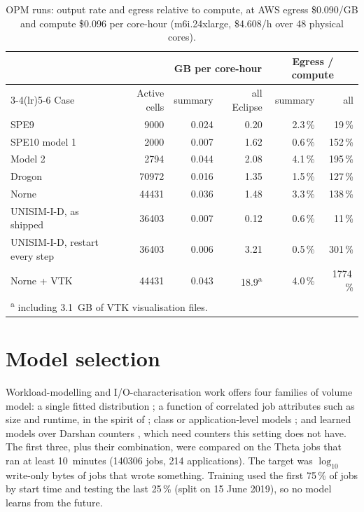 \documentclass[11pt,a4paper]{article}
\begin{document}
\begin{table}[ht]
\centering\small
\caption{OPM runs: output rate and egress relative to compute, at AWS egress
\$0.090/GB and compute \$0.096 per core-hour (m6i.24xlarge, \$4.608/h over 48
physical cores).}\label{tab:opm}
\begin{tabular}{lrrrrr}
\toprule
& & \multicolumn{2}{c}{GB per core-hour} & \multicolumn{2}{c}{Egress / compute} \\
\cmidrule(lr){3-4}\cmidrule(lr){5-6}
Case & Active cells & summary & all Eclipse & summary & all \\
\midrule
SPE9                        & \num{9000}  & 0.024 & 0.20 & 2.3\,\% & 19\,\% \\
SPE10 model 1               & \num{2000}  & 0.007 & 1.62 & 0.6\,\% & 152\,\% \\
Model 2                     & \num{2794}  & 0.044 & 2.08 & 4.1\,\% & 195\,\% \\
Drogon                      & \num{70972} & 0.016 & 1.35 & 1.5\,\% & 127\,\% \\
Norne                       & \num{44431} & 0.036 & 1.48 & 3.3\,\% & 138\,\% \\
UNISIM-I-D, as shipped      & \num{36403} & 0.007 & 0.12 & 0.6\,\% & 11\,\% \\
UNISIM-I-D, restart every step & \num{36403} & 0.006 & 3.21 & 0.5\,\% & 301\,\% \\
Norne + VTK                 & \num{44431} & 0.043 & 18.9\textsuperscript{a} & 4.0\,\% & 1774\,\% \\
\bottomrule
\multicolumn{6}{l}{\footnotesize \textsuperscript{a} including \SI{3.1}{GB} of VTK visualisation files.}
\end{tabular}
\end{table}

\section{Model selection}\label{sec:selection}
Workload-modelling and I/O-characterisation work offers four families of volume
model: a single fitted distribution \citep{feitelson2015workload}; a function of
correlated job attributes such as size and runtime, in the spirit of
\citet{lublin2003workload}; class or application-level models
\citep{feitelson2015workload,luu2015multiplatform}; and learned models over Darshan
counters \citep{isakov2020hpc}, which need counters this setting does not have. The
first three, plus their combination, were compared on the Theta jobs that ran at
least 10~minutes (\num{140306} jobs, 214 applications). The target was
$\log_{10}$ write-only bytes of jobs that wrote something. Training used the first
75\,\% of jobs by start time and testing the last 25\,\% (split on 15 June 2019),
so no model learns from the future.
\end{document}

